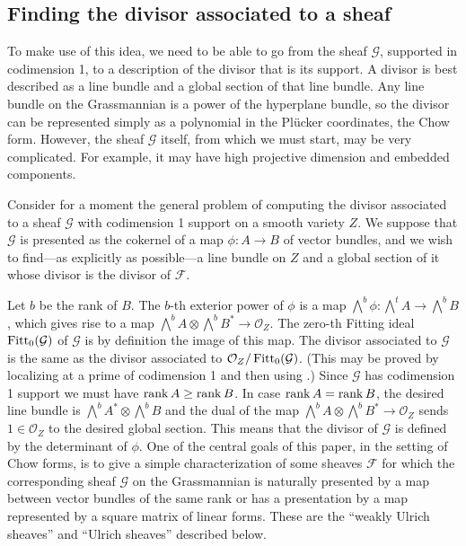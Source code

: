 \documentclass{jams-l}
\theoremstyle{definition}
\theoremstyle{remark}
\newcommand{\F}{{\mathcal F}}
\newcommand{\G}{{\mathcal G}}
\newcommand{\Ocal}{{\mathcal O}}
\newcommand{\rank}{\mathop{\rm rank}}
\newcommand{\Fitt}{\mathop{\rm Fitt}}
\begin{document}
\subsection*{Finding the divisor associated to a sheaf}

To make use of this idea,
we need to be able to go from the sheaf $\G$,
supported in codimension 1, to a description of the divisor
that is its support. A divisor is best described as
a line bundle and a global section of that line bundle.
Any line bundle on the Grassmannian
is a power of the hyperplane bundle, so
the divisor can be represented simply as
a polynomial in the Pl\"ucker coordinates, the Chow form.
However, the sheaf $\G$
itself, from which we must start,
 may be very complicated. For example, it may have high projective
dimension and embedded components.

Consider for a moment the general problem of computing
the divisor associated to a sheaf $\G$ with codimension 1 support on
a smooth variety $Z$. 
We suppose that $\G$ is
presented as the cokernel
of a map $\phi: A\to B$ of vector bundles,
and we wish to find---as explicitly as possible---a 
line bundle on $Z$ and
a global section of it whose divisor is the divisor
of $\F$. 

Let
$b$ be the rank of $B$. The $b$-th exterior power
of $\phi$ is a map $\bigwedge^b\phi: \bigwedge^t A \to \bigwedge^b B$,
which gives rise to a map
$\bigwedge^b A \otimes \bigwedge^b B^* \to \Ocal_Z$. The
zero-th Fitting ideal $\Fitt_0(\G)$ of $\G$
 is by definition the 
image of this map. The divisor associated to $\G$ is
the same as the divisor associated to $\Ocal_Z/\Fitt_0(\G)$.
(This may be proved by localizing
at a prime of codimension 1 and then using
\cite[Example A.2.3]{Fulton 1984}.) 
Since $\G$ has codimension 1 support we must have
$\rank A \ge \rank B$. In case $\rank A = \rank B$, the
desired line bundle is  
$\bigwedge^b A^* \otimes \bigwedge^b B
$
and the
dual
of the map 
$\bigwedge^b A \otimes \bigwedge^b B^* \to \Ocal_Z$
sends $1\in \Ocal_Z$ to the desired global section.
This means
that the divisor of $\G$ is defined by the 
determinant of $\phi$. 
One of the central goals of this paper,
in the setting of Chow forms, is to give a
simple characterization of some sheaves
$\F$ for which the corresponding
sheaf $\G$ on the Grassmannian is naturally presented by
a map between vector bundles of the same rank
or
has a presentation by a map represented by
a square matrix of linear forms. These are the
``weakly Ulrich sheaves'' and ``Ulrich
sheaves'' described below.
\end{document}
